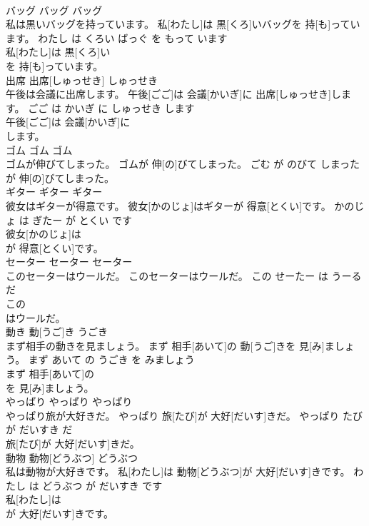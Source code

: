 \documentclass[8pt]{extreport}
\begin{document}
\begin{CJK}{UTF8}{min}
\\	バッグ	バッグ	バッグ	
\\	私は黒いバッグを持っています。	私[わたし]は 黒[くろ]いバッグを 持[も]っています。	わたし は くろい ばっぐ を もって います	
\\	私[わたし]は 黒[くろ]い
\\	を 持[も]っています。			
\\	出席	出席[しゅっせき]	しゅっせき	
\\	午後は会議に出席します。	午後[ごご]は 会議[かいぎ]に 出席[しゅっせき]します。	ごご は かいぎ に しゅっせき します	
\\	午後[ごご]は 会議[かいぎ]に
\\	します。			
\\	ゴム	ゴム	ゴム	
\\	ゴムが伸びてしまった。	ゴムが 伸[の]びてしまった。	ごむ が のびて しまった	
\\	が 伸[の]びてしまった。			
\\	ギター	ギター	ギター	
\\	彼女はギターが得意です。	彼女[かのじょ]はギターが 得意[とくい]です。	かのじょ は ぎたー が とくい です	
\\	彼女[かのじょ]は
\\	が 得意[とくい]です。			
\\	セーター	セーター	セーター	
\\	このセーターはウールだ。	このセーターはウールだ。	この せーたー は うーる だ	
\\	この
\\	はウールだ。			
\\	動き	動[うご]き	うごき	
\\	まず相手の動きを見ましょう。	まず 相手[あいて]の 動[うご]きを 見[み]ましょう。	まず あいて の うごき を みましょう	
\\	まず 相手[あいて]の
\\	を 見[み]ましょう。			
\\	やっぱり	やっぱり	やっぱり	
\\	やっぱり旅が大好きだ。	やっぱり 旅[たび]が 大好[だいす]きだ。	やっぱり たび が だいすき だ	
\\	旅[たび]が 大好[だいす]きだ。			
\\	動物	動物[どうぶつ]	どうぶつ	
\\	私は動物が大好きです。	私[わたし]は 動物[どうぶつ]が 大好[だいす]きです。	わたし は どうぶつ が だいすき です	
\\	私[わたし]は
\\	が 大好[だいす]きです。			

\end{CJK}
\end{document}
